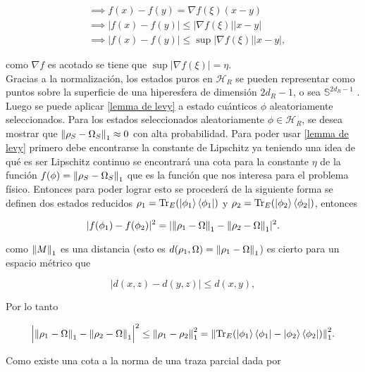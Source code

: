 \begin{align}
&\implies f(x)-f(y) = \nabla f(\xi) (x-y) \\
&\implies |f(x)- f(y)| \le |\nabla f(\xi)| |x-y| \\
&\implies |f(x)- f(y)| 	\le \sup|\nabla f(\xi)| |x-y|,
\end{align}

como $\nabla f$ es acotado se tiene que $\sup |\nabla f(\xi)|=\eta$.\\

Gracias a la normalización, los estados puros en $\mathcal{H}_{R}$ se pueden representar como puntos sobre la superficie de una hiperesfera de dimensión $2d_{R}-1$, o sea  $\mathbb{S}^{2d_{R}-1}$ \cite{SakuraiQuantum}. Luego se puede aplicar \ref{lemma de levy} a estado cuánticos $\phi$ aleatoriamente seleccionados. Para los estados seleccionados aleatoriamente $\phi \in \mathcal{H}_{R}$, se desea mostrar que $\norm{\rho_{S}- \Omega_{S}}_{1} \approx 0$ con alta probabilidad. Para poder usar \ref{lemma de levy} primero  debe encontrarse la constante de Lipschitz ya teniendo una idea de qué es ser Lipschitz continuo se encontrará una cota para la constante $\eta$ de la función $f(\phi)=\norm{\rho_{S}-\Omega_{S}}_{1}$ que es la función que nos interesa para el problema físico. Entonces para poder lograr esto se procederá de la siguiente forma se definen dos estados reducidos $\rho_{1}= \Tr_{E} (\ket{\phi_{1}} \bra{\phi_{1}})$ y $\rho_{2}= \Tr_{E}(\ket{\phi_{2}} \bra{\phi_{2}})$, entonces

\begin{equation}
|f(\phi_{1})-f(\phi_{2})|^2= |\norm{\rho_{1}-\Omega}_{1} - \norm{\rho_{2}-\Omega}_{1}|^2.
\end{equation}

como $\norm{M}_{1}$ es una distancia (esto es $d(\rho_{1},\Omega)= \norm{\rho_{1}-\Omega}_{1}$) es cierto para un espacio métrico que

\begin{equation}
|d(x,z)-d(y,z)| \le d(x,y),
\end{equation}

Por lo tanto 

\begin{equation}
\Big | \norm{\rho_{1}-\Omega}_{1} - \norm{\rho_{2}-\Omega}_{1} \Big |^2 \le \norm{\rho_{1}- \rho_{2} }_{1}^2= \norm{\Tr_{E}(\ket{\phi_{1}} \bra{\phi_{1}}-\ket{\phi_{2}} \bra{\phi_{2}})}_{1}^{2}.
\end{equation}

Como existe una cota a la norma de una traza parcial dada por

